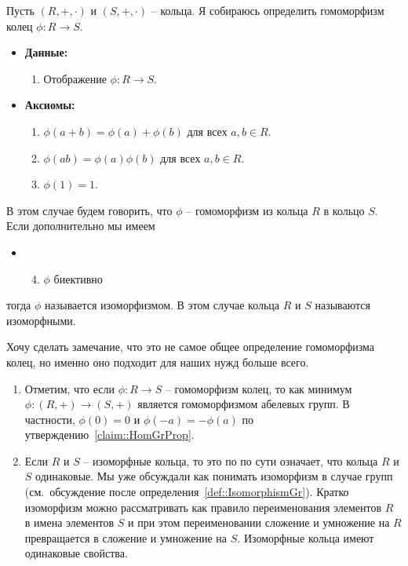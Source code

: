 \begin{definition}
Пусть $(R, +, \cdot)$ и $(S, +, \cdot)$ -- кольца.
Я собираюсь определить гомоморфизм колец $\phi\colon R\to S$.
\begin{itemize}
\item\textbf{Данные:} 
\begin{enumerate}
\item Отображение $\phi\colon R\to S$.
\end{enumerate}

\item\textbf{Аксиомы:}
\begin{enumerate}
\item $\phi(a + b) = \phi(a) + \phi(b)$ для всех $a, b\in R$.

\item $\phi(ab) = \phi(a)\phi(b)$ для всех $a,b\in R$.

\item $\phi(1) = 1$.
\end{enumerate}
\end{itemize}
В этом случае будем говорить, что $\phi$ -- гомоморфизм из кольца $R$ в кольцо $S$.
Если дополнительно мы имеем
\begin{itemize}
\item[]
\begin{enumerate}
\setcounter{enumi}{3}
\item $\phi$ биективно
\end{enumerate}
\end{itemize}
тогда $\phi$ называется изоморфизмом.
В этом случае кольца $R$ и $S$ называются изоморфными.
\end{definition}

Хочу сделать замечание, что это не самое общее определение гомоморфизма колец, но именно оно подходит для наших нужд больше всего.

\begin{remarks}
\begin{enumerate}
\item Отметим, что если $\phi\colon R\to S$ -- гомоморфизм колец, то как минимум $\phi\colon (R,+) \to (S, +)$ является гомоморфизмом абелевых групп.
В частности, $\phi(0) = 0$ и $\phi(-a) = - \phi(a)$ по утверждению~\ref{claim::HomGrProp}.

\item Если $R$ и $S$ -- изоморфные кольца, то это по по сути означает, что кольца $R$ и $S$ одинаковые.
Мы уже обсуждали как понимать изоморфизм в случае групп (см.~обсуждение после определения~\ref{def::IsomorphismGr}).
Кратко изоморфизм можно рассматривать как правило переименования элементов $R$ в имена элементов $S$ и при этом переименовании сложение и умножение на $R$ превращается в сложение и умножение на $S$.
Изоморфные кольца имеют одинаковые свойства.
\end{enumerate}
\end{remarks}

